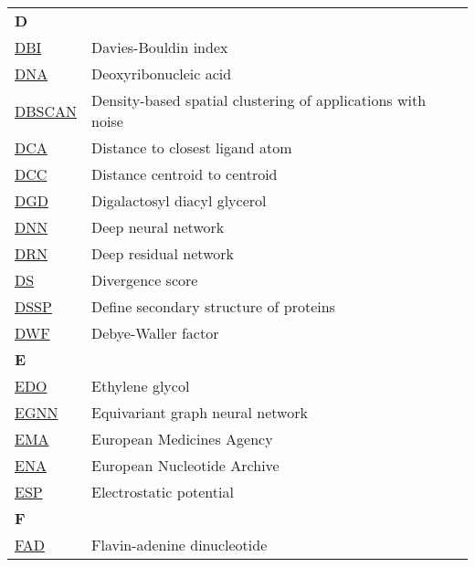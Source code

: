 \begin{longtable}[l]{@{}p{2.5cm}p{12cm}@{}}
\textbf{\large D} & \\[0.25cm]
\textmd{\href{https://en.wikipedia.org/wiki/Davies–Bouldin_index}{DBI}} & Davies-Bouldin index \\
\textmd{\href{https://en.wikipedia.org/wiki/DNA}{DNA}} & Deoxyribonucleic acid \\
\textmd{\href{https://en.wikipedia.org/wiki/DBSCAN}{DBSCAN}} & Density-based spatial clustering of applications with noise \\
\textmd{\href{https://academic.oup.com/bioinformatics/article/37/12/1681/6104838}{DCA}} & Distance to closest ligand atom \\
\textmd{\href{https://academic.oup.com/bioinformatics/article/37/12/1681/6104838}{DCC}} & Distance centroid to centroid \\
\textmd{\href{https://www.ebi.ac.uk/pdbe-srv/pdbechem/chemicalCompound/show/DGD}{DGD}} & Digalactosyl diacyl glycerol \\
\textmd{\href{https://en.wikipedia.org/wiki/Deep_learning\#Deep_neural_networks}{DNN}} & Deep neural network \\
\textmd{\href{https://en.wikipedia.org/wiki/Residual_neural_network}{DRN}} & Deep residual network \\
\textmd{\href{https://onlinelibrary.wiley.com/doi/10.1002/prot.340110408}{DS}} & Divergence score \\
\textmd{\href{https://en.wikipedia.org/wiki/DSSP_(algorithm)}{DSSP}} & Define secondary structure of proteins \\
\textmd{\href{https://en.wikipedia.org/wiki/Debye–Waller_factor}{DWF}} & Debye-Waller factor \\[0.3175cm]
\textbf{\large E} & \\[0.25cm]
\textmd{\href{https://www.ebi.ac.uk/pdbe-srv/pdbechem/chemicalCompound/show/EDO}{EDO}} & Ethylene glycol \\
\textmd{\href{https://arxiv.org/abs/2404.07194}{EGNN}} & Equivariant graph neural network \\
\textmd{\href{https://en.wikipedia.org/wiki/European_Medicines_Agency}{EMA}} & European Medicines Agency \\
\textmd{\href{https://en.wikipedia.org/wiki/European_Nucleotide_Archive}{ENA}} & European Nucleotide Archive \\
\textmd{\href{https://en.wikipedia.org/wiki/Electric_potential}{ESP}} & Electrostatic potential \\[0.3175cm]
\textbf{\large F} & \\[0.25cm]
\textmd{\href{https://www.ebi.ac.uk/pdbe-srv/pdbechem/chemicalCompound/show/FAD}{FAD}} & Flavin-adenine dinucleotide \\

\end{longtable}

